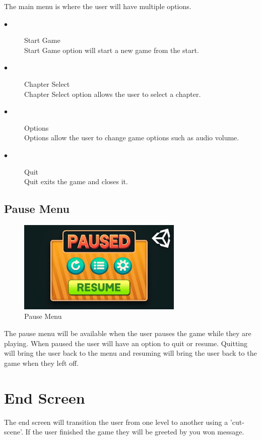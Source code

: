 \documentclass[a4paper]{scrreprt}
\begin{document}
The main menu is where the user will have multiple options.

\begin{description}
\item[$\bullet$] Start Game \\
Start Game option will start a new game from the start.
\item[$\bullet$] Chapter Select \\
Chapter Select option allows the user to select a chapter.
\item[$\bullet$] Options \\
Options allow the user to change game options such as audio volume.
\item[$\bullet$] Quit \\
Quit exits the game and closes it.
\end{description}

\subsection{Pause Menu}

\begin{figure}[H]
\centering
\includegraphics[width=0.70\textwidth]{pause}
\caption{\label{fig:art} Pause Menu}
\end{figure}

The pause menu will be available when the user pauses the game while they are playing. When paused the user will have an option to quit or resume.
Quitting will bring the user back to the menu and resuming will bring the user back to the game when they left off.

\section{End Screen}

The end screen will transition the user from one level to another using a 'cut-scene'. If the user finished the game they will be greeted by you won message.
\end{document}
